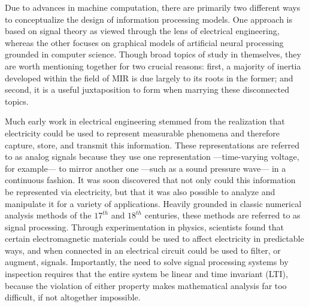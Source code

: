 
Due to advances in machine computation, there are primarily two different ways to conceptualize the design of information processing models.
One approach is based on signal theory as viewed through the lens of electrical engineering, whereas the other focuses on graphical models of artificial neural processing grounded in computer science.
Though broad topics of study in themselves, they are worth mentioning together for two crucial reasons: first, a majority of inertia developed within the field of MIR is due largely to its roots in the former; and second, it is a useful juxtaposition to form when marrying these disconnected topics.


Much early work in electrical engineering stemmed from the realization that electricity could be used to represent measurable phenomena and therefore capture, store, and transmit this information.
These representations are referred to as analog signals because they use one representation ---time-varying voltage, for example--- to mirror another one ---such as a sound pressure wave--- in a continuous fashion.
It was soon discovered that not only could this information be represented via electricity, but that it was also possible to analyze and manipulate it for a variety of applications.
Heavily grounded in classic numerical analysis methods of the $17^{th}$ and $18^{th}$ centuries, these methods are referred to as signal processing.
Through experimentation in physics, scientists found that certain electromagnetic materials could be used to affect electricity in predictable ways, and when connected in an electrical circuit could be used to filter, or augment, signals.
Importantly, the need to solve signal processing systems by inspection requires that the entire system be linear and time invariant (LTI), because the violation of either property makes mathematical analysis far too difficult, if not altogether impossible.

